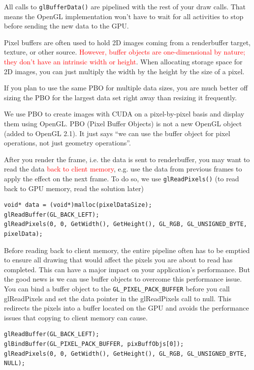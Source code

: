 All calls to \verb!glBufferData()! are pipelined with the rest of your
draw calls. That means the OpenGL implementation won't have to wait
for all activities to stop before sending the new data to the GPU.

\begin{framed}
  Pixel buffers are often used to hold 2D images coming from a
  renderbuffer target, texture, or other source.
  \textcolor{red}{However, buffer objects are one-dimensional by
    nature; they don't have an intrinsic width or height}.
  When allocating storage space for 2D images, you can just multiply
  the width by the height by the size of a pixel.

    If you plan to use the same PBO for multiple data sizes, you are
    much better off sizing the PBO for the largest data set right away
    than resizing it frequently.
\end{framed}

We use PBO to create images with CUDA on a pixel-by-pixel basis and
display them using OpenGL. PBO (Pixel Buffer Objects) is not a new
OpenGL object (added to OpenGL 2.1). It just says ``we can use the
buffer object for pixel operations, not just geometry operations''.


After you render the frame, i.e. the data is sent to renderbuffer, you
may want to read the data \textcolor{red}{ back to client memory},
e.g. use the data from previous frames to apply the effect on the next
frame. To do so, we use \verb!glReadPixels()! (to read back to GPU
memory, read the solution later)
\begin{verbatim}
void* data = (void*)malloc(pixelDataSize);
glReadBuffer(GL_BACK_LEFT);
glReadPixels(0, 0, GetWidth(), GetHeight(), GL_RGB, GL_UNSIGNED_BYTE, pixelData);
\end{verbatim}
Before reading back to client memory, the entire pipeline often has to
be emptied to ensure all drawing that would affect the pixels you are
about to read has completed.  This can have a major impact on your
application's performance. But the good news is we can use buffer
objects to overcome this performance issue. You can bind a buffer
object to the \verb!GL_PIXEL_PACK_BUFFER! before you call glReadPixels
and set the data pointer in the glReadPixels call to null. This
redirects the pixels into a buffer located on the GPU and avoids the
performance issues that copying to client memory can cause.
\begin{verbatim}
glReadBuffer(GL_BACK_LEFT);
glBindBuffer(GL_PIXEL_PACK_BUFFER, pixBuffObjs[0]);
glReadPixels(0, 0, GetWidth(), GetHeight(), GL_RGB, GL_UNSIGNED_BYTE, NULL);
\end{verbatim}

